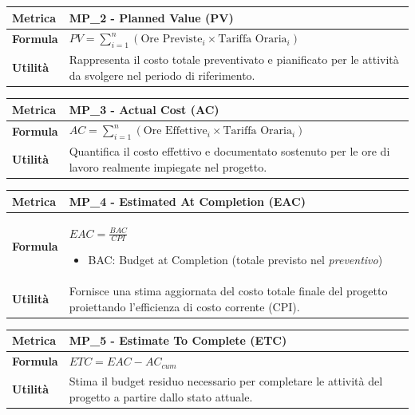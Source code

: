 \documentclass[12pt, a4paper]{article}
\begin{document}
\begin{table}[H]
\centering
\renewcommand{\arraystretch}{1.5}
\begin{tabular}{|l|p{12cm}|}
\hline
\textbf{Metrica} & MP\_2 - Planned Value (PV) \\ \hline
\textbf{Formula} & $PV=\sum_{i=1}^{n}(\text{Ore Previste}_{i}\times \text{Tariffa Oraria}_{i})$ \\ \hline
\textbf{Utilità} & Rappresenta il costo totale preventivato e pianificato per le attività da svolgere nel periodo di riferimento. \\ \hline
\end{tabular}
\end{table}

\begin{table}[H]
\centering
\renewcommand{\arraystretch}{1.5}
\begin{tabular}{|l|p{12cm}|}
\hline
\textbf{Metrica} & MP\_3 - Actual Cost (AC) \\ \hline
\textbf{Formula} & $AC = \sum_{i=1}^{n} (\text{Ore Effettive}_{i} \times \text{Tariffa Oraria}_{i})$ \\ \hline
\textbf{Utilità} & Quantifica il costo effettivo e documentato sostenuto per le ore di lavoro realmente impiegate nel progetto. \\ \hline
\end{tabular}
\end{table}

\begin{table}[H]
\centering
\renewcommand{\arraystretch}{1.5}
\begin{tabular}{|l|p{12cm}|}
\hline
\textbf{Metrica} & MP\_4 - Estimated At Completion (EAC) \\ \hline
\textbf{Formula} & $EAC=\frac{BAC}{CPI}$  \begin{itemize}
    \item BAC: Budget at Completion (totale previsto nel \textit{preventivo})
\end{itemize}\\ \hline
\textbf{Utilità} & Fornisce una stima aggiornata del costo totale finale del progetto proiettando l'efficienza di costo corrente (CPI). \\ \hline
\end{tabular}
\end{table}

\begin{table}[H]
\centering
\renewcommand{\arraystretch}{1.5}
\begin{tabular}{|l|p{12cm}|}
\hline
\textbf{Metrica} & MP\_5 - Estimate To Complete (ETC) \\ \hline
\textbf{Formula} & $ETC=EAC-AC_{cum}$ \\ \hline
\textbf{Utilità} & Stima il budget residuo necessario per completare le attività del progetto a partire dallo stato attuale. \\ \hline
\end{tabular}
\end{table}
\end{document}
